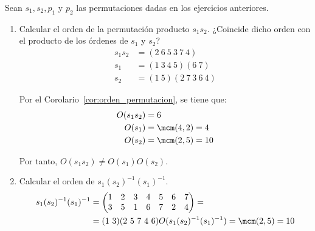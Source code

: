 \begin{ejercicio}\label{ej:2.17}
    Sean $s_1, s_2, p_1$ y $p_2$ las permutaciones dadas en los ejercicios anteriores.
    \begin{enumerate}
        \item Calcular el orden de la permutación producto $s_1s_2$. ¿Coincide dicho orden con el producto de los órdenes de $s_1$ y $s_2$?
        \begin{align*}
            s_1s_2 &= (2\ 6\ 5\ 3\ 7\ 4)\\
            s_1 &= (1\ 3\ 4\ 5)(6\ 7)\\
            s_2 &= (1\ 5)(2\ 7\ 3\ 6\ 4)
        \end{align*}

        Por el Corolario~\ref{cor:orden_permutacion}, se tiene que:
        \begin{align*}
            O(s_1s_2) &= 6\\
            O(s_1) &= \mcm(4, 2) = 4\\
            O(s_2) &= \mcm(2, 5) = 10
        \end{align*}

        Por tanto, $O(s_1s_2) \neq O(s_1)O(s_2)$.
        
        \item Calcular el orden de $s_1(s_2)^{-1}(s_1)^{-1}$.
        \begin{align*}
            s_1(s_2)^{-1}(s_1)^{-1}
            &=\begin{pmatrix}
                1 & 2 & 3 & 4 & 5 & 6 & 7 \\
                3 & 5 & 1 & 6 & 7 & 2 & 4
            \end{pmatrix}
            =\\&= (1\ 3)(2\ 5\ 7\ 4\ 6)
            O(s_1(s_2)^{-1}(s_1)^{-1}) = \mcm(2, 5) = 10
        \end{align*}


\end{enumerate}
\end{ejercicio}
